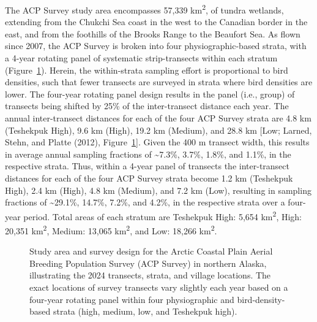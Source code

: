 \documentclass[
]{article}
\begin{document}
The ACP Survey study area encompasses 57,339 km\textsuperscript{2}, of
tundra wetlands, extending from the Chukchi Sea coast in the west to the
Canadian border in the east, and from the foothills of the Brooks Range
to the Beaufort Sea. As flown since 2007, the ACP Survey is broken into
four physiographic-based strata, with a 4-year rotating panel of
systematic strip-transects within each stratum (Figure~\ref{fig-Fig1}).
Herein, the within-strata sampling effort is proportional to bird
densities, such that fewer transects are surveyed in strata where bird
densities are lower. The four-year rotating panel design results in the
panel (i.e., group) of transects being shifted by 25\% of the
inter-transect distance each year. The annual inter-transect distances
for each of the four ACP Survey strata are 4.8 km (Teshekpuk High), 9.6
km (High), 19.2 km (Medium), and 28.8 km {[}Low; Larned, Stehn, and
Platte (2012), Figure~\ref{fig-Fig1}{]}. Given the 400 m transect width,
this results in average annual sampling fractions of
\textasciitilde7.3\%, 3.7\%, 1.8\%, and 1.1\%, in the respective strata.
Thus, within a 4-year panel of transects the inter-transect distances
for each of the four ACP Survey strata become 1.2 km (Teshekpuk High),
2.4 km (High), 4.8 km (Medium), and 7.2 km (Low), resulting in sampling
fractions of \textasciitilde29.1\%, 14.7\%, 7.2\%, and 4.2\%, in the
respective strata over a four-year period. Total areas of each stratum
are Teshekpuk High: 5,654 km\textsuperscript{2}, High: 20,351
km\textsuperscript{2}, Medium: 13,065 km\textsuperscript{2}, and Low:
18,266 km\textsuperscript{2}.

\begin{figure}


\caption{\label{fig-Fig1}Study area and survey design for the Arctic
Coastal Plain Aerial Breeding Population Survey (ACP Survey) in northern
Alaska, illustrating the 2024 transects, strata, and village locations.
The exact locations of survey transects vary slightly each year based on
a four-year rotating panel within four physiographic and
bird-density-based strata (high, medium, low, and Teshekpuk high).}

\end{figure}%
\end{document}
